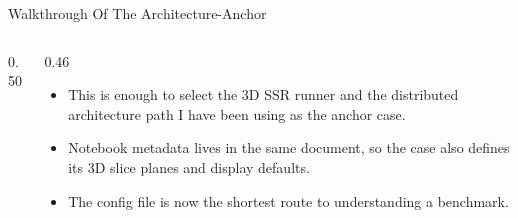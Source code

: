\documentclass[aspectratio=169,10pt]{beamer}
\begin{document}
\begin{frame}{Walkthrough Of The Architecture-Anchor }
\small
\begin{columns}[T,totalwidth=\textwidth]
\begin{column}{0.50\textwidth}
\begin{pseudobox}
\code{[problem]}\\
\\
\\
\\
\\[0.10cm]
\code{[execution]}\\
\\
\\[0.10cm]
\\
\end{pseudobox}
\end{column}
\begin{column}{0.46\textwidth}
\begin{softbox}
\begin{itemize}
  \item This is enough to select the 3D SSR runner and the distributed architecture path I have been using as the anchor case.
  \item Notebook metadata lives in the same document, so the case also defines its 3D slice planes and display defaults.
  \item The config file is now the shortest route to understanding a benchmark.
\end{itemize}
\end{softbox}
\end{column}
\end{columns}
\end{frame}
\end{document}
